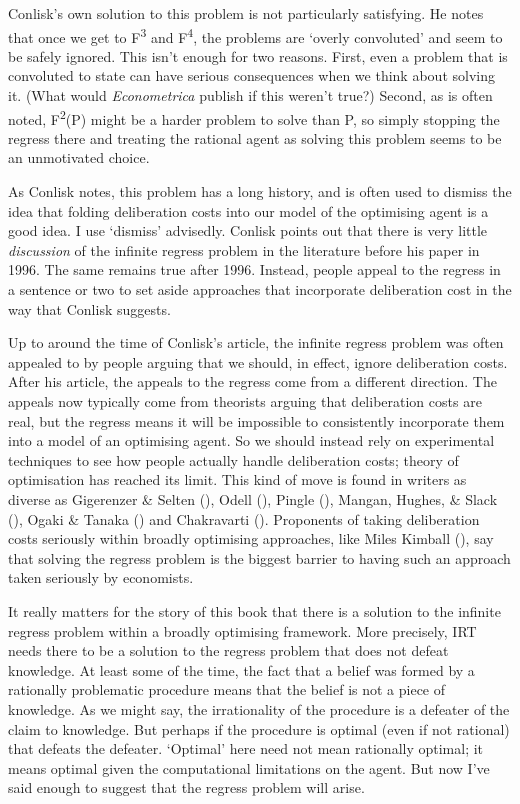 \documentclass[
  10pt,
  letterpaper,
  twoside]{scrbook}
\begin{document}
Conlisk's own solution to this problem is not particularly satisfying.
He notes that once we get to F\textsuperscript{3} and
F\textsuperscript{4}, the problems are `overly convoluted' and seem to
be safely ignored. This isn't enough for two reasons. First, even a
problem that is convoluted to state can have serious consequences when
we think about solving it. (What would \emph{Econometrica} publish if
this weren't true?) Second, as is often noted, F\textsuperscript{2}(P)
might be a harder problem to solve than P, so simply stopping the
regress there and treating the rational agent as solving this problem
seems to be an unmotivated choice.

As Conlisk notes, this problem has a long history, and is often used to
dismiss the idea that folding deliberation costs into our model of the
optimising agent is a good idea. I use `dismiss' advisedly. Conlisk
points out that there is very little \emph{discussion} of the infinite
regress problem in the literature before his paper in 1996. The same
remains true after 1996. Instead, people appeal to the regress in a
sentence or two to set aside approaches that incorporate deliberation
cost in the way that Conlisk suggests.

Up to around the time of Conlisk's article, the infinite regress problem
was often appealed to by people arguing that we should, in effect,
ignore deliberation costs. After his article, the appeals to the regress
come from a different direction. The appeals now typically come from
theorists arguing that deliberation costs are real, but the regress
means it will be impossible to consistently incorporate them into a
model of an optimising agent. So we should instead rely on experimental
techniques to see how people actually handle deliberation costs; theory
of optimisation has reached its limit. This kind of move is found in
writers as diverse as Gigerenzer \& Selten
(), Odell
(), Pingle
(), Mangan, Hughes, \& Slack
(), Ogaki \& Tanaka
() and Chakravarti
(). Proponents of taking
deliberation costs seriously within broadly optimising approaches, like
Miles Kimball (), say that solving the
regress problem is the biggest barrier to having such an approach taken
seriously by economists.

It really matters for the story of this book that there is a solution to
the infinite regress problem within a broadly optimising framework. More
precisely, IRT needs there to be a solution to the regress problem that
does not defeat knowledge. At least some of the time, the fact that a
belief was formed by a rationally problematic procedure means that the
belief is not a piece of knowledge. As we might say, the irrationality
of the procedure is a defeater of the claim to knowledge. But perhaps if
the procedure is optimal (even if not rational) that defeats the
defeater. `Optimal' here need not mean rationally optimal; it means
optimal given the computational limitations on the agent. But now I've
said enough to suggest that the regress problem will arise.
\end{document}
